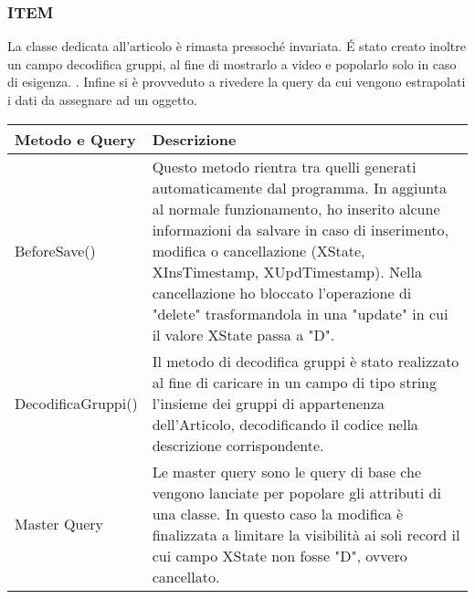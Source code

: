 
\subsubsection{ITEM}
La classe dedicata all'articolo è rimasta pressoché invariata. \'E stato creato inoltre un campo decodifica gruppi, al fine di mostrarlo a video e popolarlo solo in caso di esigenza. . Infine si è provveduto a rivedere la query da cui vengono estrapolati i dati da assegnare ad un oggetto.

\begin{center}
	\begin{tabular}{ p{3cm}|p{} }
		\hline
		\textbf{Metodo e Query} & \textbf{Descrizione}\\
		\hline
		BeforeSave() & Questo metodo rientra tra quelli generati automaticamente dal programma. In aggiunta al normale funzionamento, ho inserito alcune informazioni da salvare in caso di inserimento, modifica o cancellazione (XState, XInsTimestamp, XUpdTimestamp). Nella cancellazione ho bloccato l'operazione di "delete" trasformandola in una "update" in cui il valore XState passa a "D".\\
		\hline
		DecodificaGruppi() & Il metodo di decodifica gruppi è stato realizzato al fine di caricare in un campo di tipo string l'insieme dei gruppi di appartenenza dell'Articolo, decodificando il codice nella descrizione corrispondente.\\
		\hline
		Master Query & Le master query sono le query di base che vengono lanciate per popolare gli attributi di una classe. In questo caso la modifica è finalizzata a limitare la visibilità ai soli record il cui campo XState non fosse "D", ovvero cancellato.\\
	
	\end{tabular}

\end{center}

